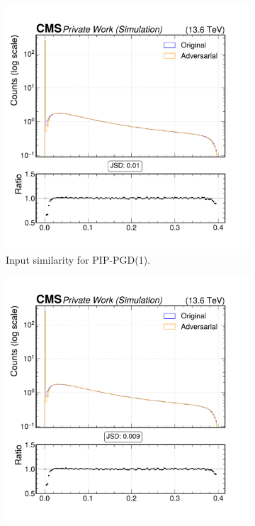 \begin{figure}[h]
  \centering
  \begin{subfigure}[t]{0.32\textwidth}
    \includegraphics[width=\linewidth]{media/output/features/compare/combined_it_1/cmp_cpf_arr_Cpfcan_BtagPf_trackDeltaR.pdf}
    \caption*{Input similarity for PIP-PGD(1).}
  \end{subfigure}\hfill
  \begin{subfigure}[t]{0.32\textwidth}
    \includegraphics[width=\linewidth]{media/output/features/compare/combined_it_2/cmp_cpf_arr_Cpfcan_BtagPf_trackDeltaR.pdf}

\end{subfigure}
\end{figure}
